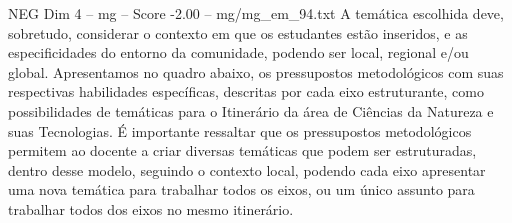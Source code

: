\begin{textsample}{NEG Dim 4 – mg – Score -2.00 – mg/mg\_em\_94.txt}
A temática escolhida deve, sobretudo, considerar o contexto em que os estudantes estão inseridos, e as especificidades do entorno da comunidade, podendo ser local, regional e/ou global.
Apresentamos no quadro abaixo, os pressupostos metodológicos com suas respectivas habilidades específicas, descritas por cada eixo estruturante, como possibilidades de temáticas para o Itinerário da área de Ciências da Natureza e suas Tecnologias.
É importante ressaltar que os pressupostos metodológicos permitem ao docente a criar diversas temáticas que podem ser estruturadas, dentro desse modelo, seguindo o contexto local, podendo cada eixo apresentar uma nova temática para trabalhar todos os eixos, ou um único assunto para trabalhar todos dos eixos no mesmo itinerário.

\end{textsample}
